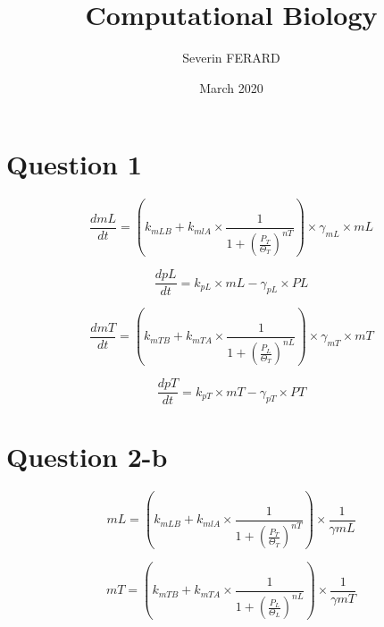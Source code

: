\documentclass{article}
\title{Computational Biology}
\author{Severin FERARD}
\date{March 2020}
\begin{document}
\maketitle

\section{Question 1}

\begin{equation} 
{\frac{dmL}{dt} =(k_{mLB}+k_{mlA} \times \frac{1}{1 + (\frac{P_T}{\Theta_T})^{nT}}) \times \gamma_{mL} \times mL}
\end{equation}

\begin{equation} 
{\frac{dpL}{dt} =k_{pL} \times mL - \gamma_{pL} \times PL}
\end{equation}

\begin{equation} 
{\frac{dmT}{dt} =(k_{mTB}+k_{mTA} \times \frac{1}{1 + (\frac{P_L}{\Theta_T})^{nL}}) \times \gamma_{mT} \times mT}
\end{equation}

\begin{equation} 
{\frac{dpT}{dt} =k_{pT} \times mT - \gamma_{pT} \times PT}
\end{equation}





\section{Question 2-b}

 
\begin{equation} 
{ mL=(k_{mLB}+k_{mlA} \times \frac{1}{1 + (\frac{P_T}{\Theta_T})^{nT}}) \times \frac{1}{\gamma mL}}
\end{equation}

\begin{equation} 
{ mT=(k_{mTB}+k_{mTA} \times \frac{1}{1 + (\frac{P_L}{\Theta_L})^{nL}}) \times \frac{1}{\gamma mT}}
\end{equation}
\end{document}
